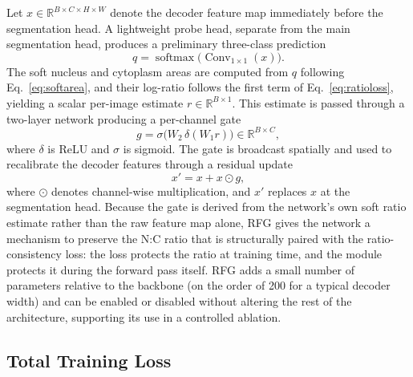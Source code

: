 \documentclass[pdflatex,sn-mathphys-num]{sn-jnl}%
\theoremstyle{thmstyleone}%
\theoremstyle{thmstyletwo}%
\theoremstyle{thmstylethree}%
\begin{document}
Let $x\in\mathbb{R}^{B\times C\times H\times W}$ denote the decoder feature map immediately before the segmentation head. A lightweight probe head, separate from the main segmentation head, produces a preliminary three-class prediction
\begin{equation}
q=\operatorname{softmax}\big(\operatorname{Conv}_{1\times1}(x)\big).
\label{eq:probe}
\end{equation}
The soft nucleus and cytoplasm areas are computed from $q$ following Eq.~\eqref{eq:softarea}, and their log-ratio follows the first term of Eq.~\eqref{eq:ratioloss}, yielding a scalar per-image estimate $r\in\mathbb{R}^{B\times1}$. This estimate is passed through a two-layer network producing a per-channel gate
\begin{equation}
g=\sigma\big(W_2\,\delta(W_1 r)\big)\in\mathbb{R}^{B\times C},
\label{eq:gate}
\end{equation}
where $\delta$ is ReLU and $\sigma$ is sigmoid. The gate is broadcast spatially and used to recalibrate the decoder features through a residual update
\begin{equation}
x'=x+x\odot g,
\label{eq:recalibrate}
\end{equation}
where $\odot$ denotes channel-wise multiplication, and $x'$ replaces $x$ at the segmentation head. Because the gate is derived from the network's own soft ratio estimate rather than the raw feature map alone, RFG gives the network a mechanism to preserve the N:C ratio that is structurally paired with the ratio-consistency loss: the loss protects the ratio at training time, and the module protects it during the forward pass itself. RFG adds a small number of parameters relative to the backbone (on the order of 200 for a typical decoder width) and can be enabled or disabled without altering the rest of the architecture, supporting its use in a controlled ablation.

\subsection{Total Training Loss}
\label{sec:totalloss}
\end{document}
